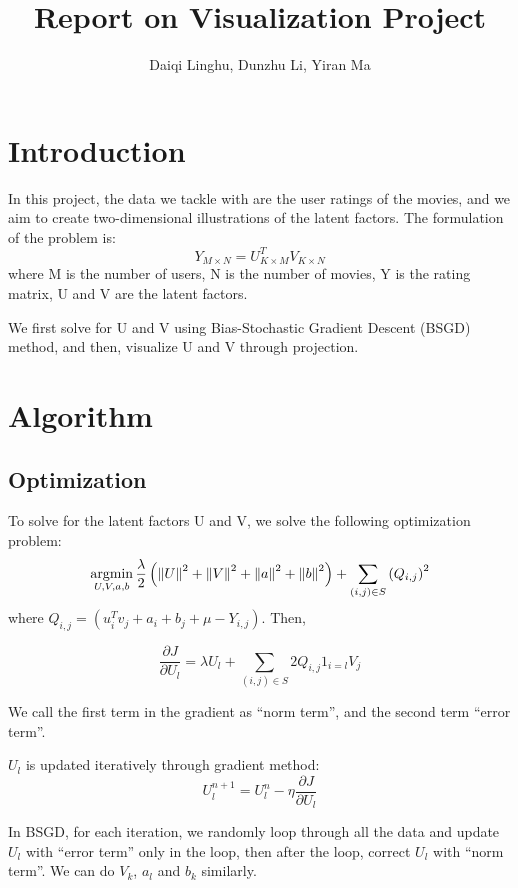 \documentclass[12pt]{article}
\title{Report on Visualization Project}
\author{Daiqi Linghu, Dunzhu Li, Yiran Ma}
\date{} %
\newcommand{\argmin}{\operatornamewithlimits{argmin}}
\newcommand\norm[1]{\left\lVert#1\right\rVert}
\begin{document}
\maketitle

\section{Introduction}
In this project, the data we tackle with are the user ratings of the movies, and we aim to create two-dimensional illustrations of the latent factors. The formulation of the problem is:
\begin{equation*}
Y_{M\times N} = U_{K\times M}^{T} V_{K\times N}
\end{equation*}
where M is the number of users, N is the number of movies, Y is the rating matrix, U and V are the latent factors. 

We first solve for U and V using Bias-Stochastic Gradient Descent (BSGD) method, and then, visualize U and V through projection.  

\section{Algorithm}
\subsection{Optimization}
To solve for the latent factors U and V, we solve the following optimization problem:
\begin{equation*}
\argmin_{U,V,a,b}\frac{\lambda}{2}\left(\norm{U}^2+\norm{V}^2+\norm{a}^2+\norm{b}^2\right)+
\sum_{(i,j)\in S}\left(  Q_{i,j}  \right)^2
\end{equation*}
where $Q_{i,j}=(u_i^T v_j + a_i + b_j +\mu-Y_{i,j})$. Then,

\begin{equation*}
\frac{\partial{J}}{\partial{U_{l}}}=\lambda U_{l}+\sum_{(i,j)\in S}2Q_{i,j}1_{i=l}V_{j}
\end{equation*}

We call the first term in the gradient as ``norm term'', and the second term ``error term''.

$U_{l}$ is updated iteratively through gradient method:
\begin{equation*}
U_{l}^{n+1}=U_{l}^{n}-\eta \frac{\partial{J}}{\partial{U_{l}}}
\end{equation*}

In BSGD, for each iteration, we randomly loop through all the data and update $U_{l}$ with ``error term'' only in the loop, then after the loop, correct $U_{l}$ with ``norm term''. We can do $V_{k}$, $a_{l}$ and $b_{k}$ similarly.
\end{document}
